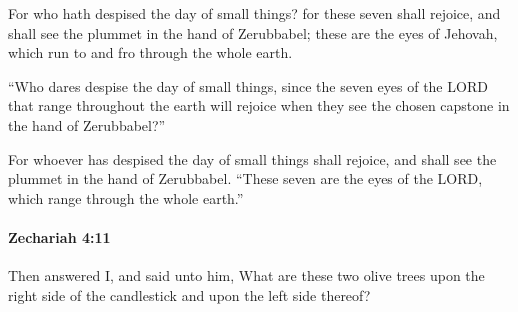 			\begin{versebox}
					\item[BHS] 
					\item[LXX] 
					\item[ASV] For who hath despised the day of small things? for these seven shall rejoice, and shall see the plummet in the hand of Zerubbabel; these are the eyes of Jehovah, which run to and fro through the whole earth.
					\item[NIV] “Who dares despise the day of small things, since the seven eyes of the LORD that range throughout the earth will rejoice when they see the chosen capstone in the hand of Zerubbabel?”
					\item[NRSV] For whoever has despised the day of small things shall rejoice, and shall see the plummet in the hand of Zerubbabel. “These seven are the eyes of the LORD, which range through the whole earth.”
			\end{versebox}

		\paragraph{Zechariah 4:11} %
			\label{ZECHARIAH-4-11}

			Then answered I, and said unto him, What are these two olive trees upon the right side of the candlestick and upon the left side thereof?

